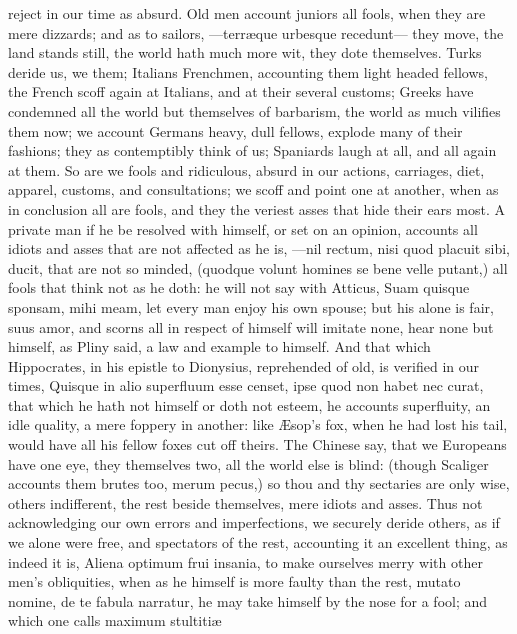 {reject in our time as absurd. Old men account juniors all fools, when
they are mere dizzards; and as to sailors, ---terr\ae{}que urbesque
recedunt--- they move, the land stands still, the world hath much more
wit, they dote themselves. Turks deride us, we them; Italians
Frenchmen, accounting them light headed fellows, the French scoff again
at Italians, and at their several customs; Greeks have condemned all
the world but themselves of barbarism, the world as much vilifies them
now; we account Germans heavy, dull fellows, explode many of their
fashions; they as contemptibly think of us; Spaniards laugh at all, and
all again at them. So are we fools and ridiculous, absurd in our
actions, carriages, diet, apparel, customs, and consultations; we 
scoff and point one at another, when as in conclusion all are fools,
 and they the veriest asses that hide their ears most. A private
man if he be resolved with himself, or set on an opinion, accounts all
idiots and asses that are not affected as he is, ---nil rectum,
nisi quod placuit sibi, ducit, that are not so minded, (quodque
volunt homines se bene velle putant,) all fools that think not as he
doth: he will not say with Atticus, Suam quisque sponsam, mihi meam,
let every man enjoy his own spouse; but his alone is fair, suus amor,
\etc{} and scorns all in respect of himself will imitate none, hear
none but himself, as Pliny said, a law and example to himself. And
that which Hippocrates, in his epistle to Dionysius, reprehended of
old, is verified in our times, Quisque in alio superfluum esse censet,
ipse quod non habet nec curat, that which he hath not himself or doth
not esteem, he accounts superfluity, an idle quality, a mere foppery in
another: like \AE{}sop's fox, when he had lost his tail, would have all
his fellow foxes cut off theirs. The Chinese say, that we Europeans
have one eye, they themselves two, all the world else is blind: (though
Scaliger accounts them brutes too, merum pecus,) so thou and thy
sectaries are only wise, others indifferent, the rest beside
themselves, mere idiots and asses. Thus not acknowledging our own
errors and imperfections, we securely deride others, as if we alone
were free, and spectators of the rest, accounting it an excellent
thing, as indeed it is, Aliena optimum frui insania, to make ourselves
merry with other men's obliquities, when as he himself is more faulty
than the rest, mutato nomine, de te fabula narratur, he may take
himself by the nose for a fool; and which one calls maximum stultiti\ae{}
}
